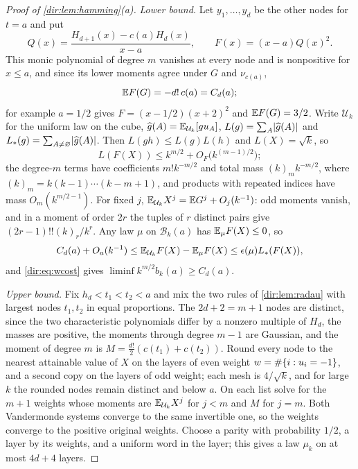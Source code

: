 \begin{proof}[Proof of \cref{dir:lem:hamming}\textup{(a)}]
\emph{Lower bound.} Let $y_1,\dots,y_d$ be the other nodes for $t=a$ and put
\[
 Q(x)=\frac{H_{d+1}(x)-c(a)H_d(x)}{x-a},\qquad F(x)=(x-a)Q(x)^2 .
\]
This monic polynomial of degree $m$ vanishes at every node and is nonpositive for $x\le a$, and
since its lower moments agree under $G$ and $\nu_{c(a)}$,
\begin{equation}\label{dir:eq:witness}
 \mathbb{E} F(G)=-d!\,c(a)=C_d(a);
\end{equation}
for example $a=1/2$ gives $F=(x-1/2)(x+2)^2$ and $\mathbb{E} F(G)=3/2$. Write $\mathcal U_k$ for the
uniform law on the cube, $\widehat g(A)=\mathbb{E}_{\mathcal U_k}[gu_A]$, $L(g)=\sum_A\lvert\widehat g(A)\rvert$
and $L_*(g)=\sum_{A\ne\varnothing}\lvert\widehat g(A)\rvert$. Then $L(gh)\le L(g)L(h)$ and
$L(X)=\sqrt k$, so
\begin{equation}\label{dir:eq:wcost}
 L(F(X))\le k^{m/2}+O_F\bigl(k^{(m-1)/2}\bigr);
\end{equation}
the degree-$m$ terms have coefficients $m!k^{-m/2}$ and total mass $(k)_mk^{-m/2}$, where
$(k)_m=k(k-1)\cdots(k-m+1)$, and products with repeated indices have mass $O_m(k^{m/2-1})$. For
fixed $j$, $\mathbb{E}_{\mathcal U_k}X^j=\mathbb{E} G^j+O_j(k^{-1})$: odd moments vanish, and in a moment
of order $2r$ the tuples of $r$ distinct pairs give $(2r-1)!!(k)_r/k^r$. Any law $\mu$ on
$\mathcal B_k(a)$ has $\mathbb{E}_\mu F(X)\le0$, so
\[
 C_d(a)+O_a(k^{-1})\le\mathbb{E}_{\mathcal U_k}F(X)-\mathbb{E}_\mu F(X)\le\epsilon(\mu)L_*(F(X)),
\]
and \eqref{dir:eq:wcost} gives $\liminf k^{m/2}b_k(a)\ge C_d(a)$.

\emph{Upper bound.} Fix $h_d<t_1<t_2<a$ and mix the two rules of \cref{dir:lem:radau} with largest
nodes $t_1,t_2$ in equal proportions. The $2d+2=m+1$ nodes are distinct, since the two
characteristic polynomials differ by a nonzero multiple of $H_d$, the masses are positive, the
moments through degree $m-1$ are Gaussian, and the moment of degree $m$ is
$M=\frac{d!}2(c(t_1)+c(t_2))$. Round every node to the nearest attainable value of $X$ on the
layers of even weight $w=\#\{i:u_i=-1\}$, and a second copy on the layers of odd weight; each
mesh is $4/\sqrt k$, and for large $k$ the rounded nodes remain distinct and below $a$. On each
list solve for the $m+1$ weights whose moments are $\mathbb{E}_{\mathcal U_k}X^j$ for $j<m$ and $M$ for
$j=m$. Both Vandermonde systems converge to the same invertible one, so the weights converge to
the positive original weights. Choose a parity with probability $1/2$, a layer by its weights,
and a uniform word in the layer; this gives a law $\mu_k$ on at most $4d+4$ layers.


\end{proof}
